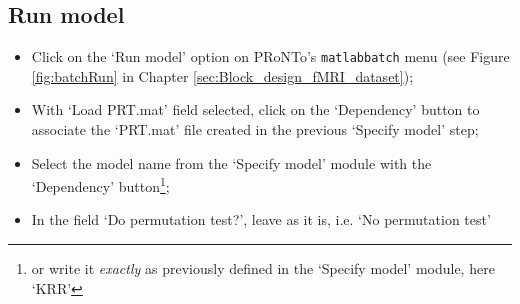 
\subsection{Run model}

\begin{itemize}

    \item Click on the `Run model' option on PRoNTo's {\tt matlabbatch} menu (see Figure \ref{fig:batchRun} in Chapter \ref{sec:Block_design_fMRI_dataset});
    
   	\item  With `Load PRT.mat' field selected, click on the `Dependency' button to associate the `PRT.mat' file created in the previous `Specify model' step;

    \item Select the model name from the `Specify model' module with the `Dependency' button\footnote{or write it {\it exactly} as previously defined in the `Specify model' module, here `KRR'};
    
    \item In the field `Do permutation test?', leave as it is, i.e. `No permutation test' 

\end{itemize}

